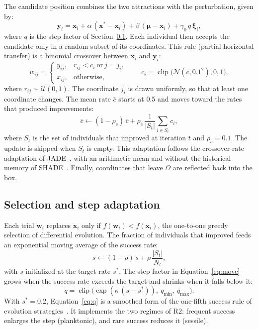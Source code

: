 \documentclass[preprint,12pt]{elsarticle}
\newcommand{\vx}{\mathbf{x}}
\newcommand{\vy}{\mathbf{y}}
\newcommand{\vm}{\boldsymbol{\mu}}
\newcommand{\vxi}{\boldsymbol{\xi}}
\DeclareMathOperator{\clip}{clip}
\begin{document}
The candidate position combines the two attractions with the perturbation,
given by:
\begin{equation}
  \vy_i = \vx_i + \alpha\,(\vx^{*} - \vx_i) + \beta\,(\vm - \vx_i)
          + \gamma_0\, q\, \vxi_i,
  \label{eq:move}
\end{equation}
where $q$ is the step factor of Section~\ref{sec:selection}. Each individual
then accepts the candidate only in a random subset of its coordinates. This
rule (partial horizontal transfer) is a binomial crossover between $\vx_i$
and $\vy_i$:
\begin{equation}
  w_{ij} = \begin{cases} y_{ij}, & r_{ij} < c_i \ \text{or}\ j = j_i,\\
  x_{ij}, & \text{otherwise}, \end{cases}
  \qquad c_i = \clip\!\big(\mathcal{N}(\bar{c}, 0.1^2), 0, 1\big),
  \label{eq:crossover}
\end{equation}
where $r_{ij} \sim \mathcal{U}(0,1)$. The coordinate $j_i$ is drawn
uniformly, so that at least one coordinate changes. The mean rate $\bar{c}$
starts at 0.5 and moves toward the rates that produced improvements:
\begin{equation}
  \bar{c} \leftarrow (1 - \rho_c)\,\bar{c} + \rho_c\,
  \frac{1}{|S_t|}\sum_{i \in S_t} c_i,
  \label{eq:crmean}
\end{equation}
where $S_t$ is the set of individuals that improved at iteration $t$ and
$\rho_c = 0.1$. The update is skipped when $S_t$ is empty. This adaptation
follows the crossover-rate adaptation of JADE~\cite{zhang2009jade}, with an
arithmetic mean and without the historical memory of
SHADE~\cite{tanabe2013shade}. Finally, coordinates that leave $\Omega$ are
reflected back into the box.

\subsection{Selection and step adaptation}
\label{sec:selection}

Each trial $\mathbf{w}_i$ replaces $\vx_i$ only if
$f(\mathbf{w}_i) < f(\vx_i)$, the one-to-one greedy selection of differential
evolution. The fraction of individuals that improved feeds an exponential
moving average of the success rate:
\begin{equation}
  s \leftarrow (1 - \rho)\,s + \rho\,\frac{|S_t|}{N_t},
  \label{eq:success}
\end{equation}
with $s$ initialized at the target rate $s^{*}$. The step factor in
Equation~\eqref{eq:move} grows when the success rate exceeds the target and
shrinks when it falls below it:
\begin{equation}
  q = \clip\!\big(\exp(\kappa\,(s - s^{*})),\ q_{\min},\ q_{\max}\big).
  \label{eq:q}
\end{equation}
With $s^{*} = 0.2$, Equation~\eqref{eq:q} is a smoothed form of the
one-fifth success rule of evolution
strategies~\cite{rechenberg1973evolutionsstrategie}. It implements the two
regimes of R2: frequent success enlarges the step (planktonic), and rare
success reduces it (sessile).
\end{document}
